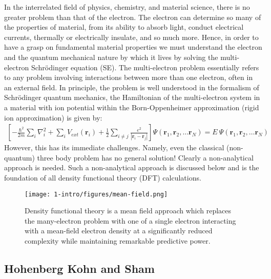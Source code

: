 In the interrelated field of physics, chemistry, and material science, there is no greater problem than that of the electron. The electron can determine so many of the properties of material, from its ability to absorb light, conduct electrical currents, thermally or electrically insulate, and so much more. Hence, in order to have a grasp on fundamental material properties we must understand the electron and the quantum mechanical nature by which it lives by solving the multi-electron Schr{\"o}dinger equation (SE). The multi-electron problem essentially refers to any problem involving interactions between more than one electron, often in an external field. In principle, the problem is well understood in the formalism of Schr{\"o}dinger quantum mechanics, the Hamiltonian of the multi-electron system in a material with ion potential within the Born-Oppenheimer approximation (rigid ion approximation) is given by:
\begin{align}
    \left[ -\frac{\hbar^2}{2m} \sum_i \nabla_i^2 + \sum_i V_{ext} (\textbf{r}_i) + \frac{1}{2} \sum_{i\neq j} \frac{e^2}{|\textbf{r}_i-\textbf{r}_j|} \right] \Psi(\textbf{r}_1,\textbf{r}_2,\ldots\textbf{r}_N) = E\ \Psi(\textbf{r}_1,\textbf{r}_2,\ldots\textbf{r}_N)
    \label{intro:eq:multi-se}
\end{align}
However, this has its immediate challenges. Namely, even the classical (non-quantum) three body problem has no general solution! Clearly a non-analytical approach is needed. Such a non-analytical approach is discussed below and is the foundation of all density functional theory (DFT) calculations.

\begin{figure}[h]
\begin{center}
\texttt{[image: 1-intro/figures/mean-field.png]}
\caption{Density functional theory is a mean field approach which replaces the many-electron problem with one of a single electron interacting with a mean-field electron density at a significantly reduced complexity while maintaining remarkable predictive power.}  \label{intro:fig:mean}
\end{center}
\end{figure}

\subsection{Hohenberg Kohn and Sham}

